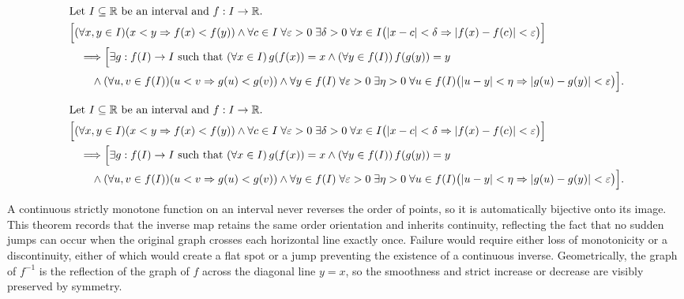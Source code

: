 \begin{remark*}
\[
\begin{aligned}
&\text{Let } I\subseteq\mathbb{R} \text{ be an interval and } f:I\to\mathbb{R}.\\
&\Bigl[(\forall x,y\in I)(x<y \Rightarrow f(x)<f(y)) \land \forall c\in I\;\forall \varepsilon>0\;\exists \delta>0\;\forall x\in I\bigl(|x-c|<\delta \Rightarrow |f(x)-f(c)|<\varepsilon\bigr)\Bigr]\\
&\quad\Longrightarrow \Bigl[\exists g:f(I)\to I \text{ such that } (\forall x\in I)\, g(f(x))=x \land (\forall y\in f(I))\, f(g(y))=y\\
&\qquad\land (\forall u,v\in f(I))(u<v \Rightarrow g(u)<g(v)) \land \forall y\in f(I)\;\forall \varepsilon>0\;\exists \eta>0\;\forall u\in f(I)\bigl(|u-y|<\eta \Rightarrow |g(u)-g(y)|<\varepsilon\bigr)\Bigr].
\end{aligned}
\]
\end{remark*}

\begin{remark*}
\[
\begin{aligned}
&\text{Let } I\subseteq\mathbb{R} \text{ be an interval and } f:I\to\mathbb{R}.\\
&\Bigl[(\forall x,y\in I)(x<y \Rightarrow f(x)<f(y)) \land \forall c\in I\;\forall \varepsilon>0\;\exists \delta>0\;\forall x\in I\bigl(|x-c|<\delta \Rightarrow |f(x)-f(c)|<\varepsilon\bigr)\Bigr]\\
&\quad\Longrightarrow \Bigl[\exists g:f(I)\to I \text{ such that } (\forall x\in I)\, g(f(x))=x \land (\forall y\in f(I))\, f(g(y))=y\\
&\qquad\land (\forall u,v\in f(I))(u<v \Rightarrow g(u)<g(v)) \land \forall y\in f(I)\;\forall \varepsilon>0\;\exists \eta>0\;\forall u\in f(I)\bigl(|u-y|<\eta \Rightarrow |g(u)-g(y)|<\varepsilon\bigr)\Bigr].
\end{aligned}
\]
\end{remark*}

\begin{remark*}[Interpretation]
A continuous strictly monotone function on an interval never reverses the order of points, so it is automatically bijective onto its image. This theorem records that the inverse map retains the same order orientation and inherits continuity, reflecting the fact that no sudden jumps can occur when the original graph crosses each horizontal line exactly once. Failure would require either loss of monotonicity or a discontinuity, either of which would create a flat spot or a jump preventing the existence of a continuous inverse. Geometrically, the graph of $f^{-1}$ is the reflection of the graph of $f$ across the diagonal line $y=x$, so the smoothness and strict increase or decrease are visibly preserved by symmetry.
\end{remark*}

